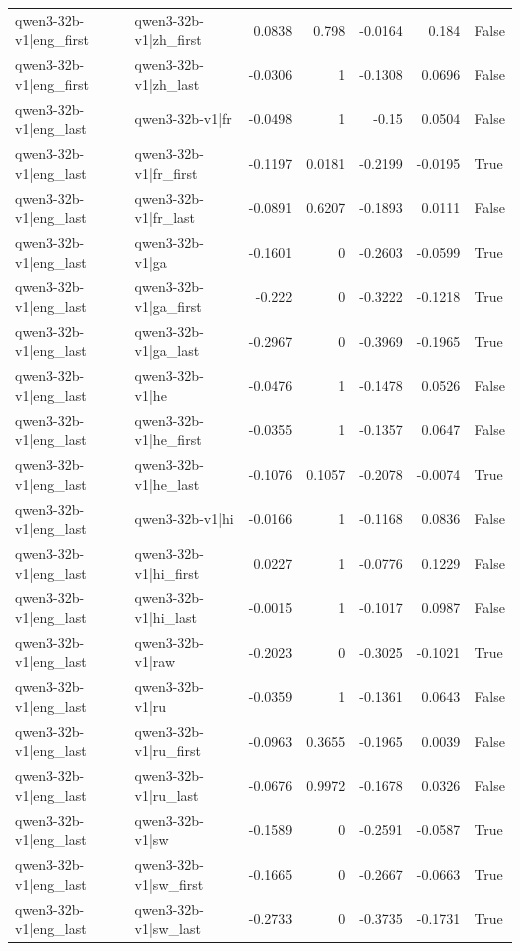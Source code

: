 \begin{table}
\begin{tabular}{l l r r r r l}
qwen3-32b-v1|eng_first & qwen3-32b-v1|zh_first & 0.0838 & 0.798 & -0.0164 & 0.184 & False \\
qwen3-32b-v1|eng_first & qwen3-32b-v1|zh_last & -0.0306 & 1 & -0.1308 & 0.0696 & False \\
qwen3-32b-v1|eng_last & qwen3-32b-v1|fr & -0.0498 & 1 & -0.15 & 0.0504 & False \\
qwen3-32b-v1|eng_last & qwen3-32b-v1|fr_first & -0.1197 & 0.0181 & -0.2199 & -0.0195 & True \\
qwen3-32b-v1|eng_last & qwen3-32b-v1|fr_last & -0.0891 & 0.6207 & -0.1893 & 0.0111 & False \\
qwen3-32b-v1|eng_last & qwen3-32b-v1|ga & -0.1601 & 0 & -0.2603 & -0.0599 & True \\
qwen3-32b-v1|eng_last & qwen3-32b-v1|ga_first & -0.222 & 0 & -0.3222 & -0.1218 & True \\
qwen3-32b-v1|eng_last & qwen3-32b-v1|ga_last & -0.2967 & 0 & -0.3969 & -0.1965 & True \\
qwen3-32b-v1|eng_last & qwen3-32b-v1|he & -0.0476 & 1 & -0.1478 & 0.0526 & False \\
qwen3-32b-v1|eng_last & qwen3-32b-v1|he_first & -0.0355 & 1 & -0.1357 & 0.0647 & False \\
qwen3-32b-v1|eng_last & qwen3-32b-v1|he_last & -0.1076 & 0.1057 & -0.2078 & -0.0074 & True \\
qwen3-32b-v1|eng_last & qwen3-32b-v1|hi & -0.0166 & 1 & -0.1168 & 0.0836 & False \\
qwen3-32b-v1|eng_last & qwen3-32b-v1|hi_first & 0.0227 & 1 & -0.0776 & 0.1229 & False \\
qwen3-32b-v1|eng_last & qwen3-32b-v1|hi_last & -0.0015 & 1 & -0.1017 & 0.0987 & False \\
qwen3-32b-v1|eng_last & qwen3-32b-v1|raw & -0.2023 & 0 & -0.3025 & -0.1021 & True \\
qwen3-32b-v1|eng_last & qwen3-32b-v1|ru & -0.0359 & 1 & -0.1361 & 0.0643 & False \\
qwen3-32b-v1|eng_last & qwen3-32b-v1|ru_first & -0.0963 & 0.3655 & -0.1965 & 0.0039 & False \\
qwen3-32b-v1|eng_last & qwen3-32b-v1|ru_last & -0.0676 & 0.9972 & -0.1678 & 0.0326 & False \\
qwen3-32b-v1|eng_last & qwen3-32b-v1|sw & -0.1589 & 0 & -0.2591 & -0.0587 & True \\
qwen3-32b-v1|eng_last & qwen3-32b-v1|sw_first & -0.1665 & 0 & -0.2667 & -0.0663 & True \\
qwen3-32b-v1|eng_last & qwen3-32b-v1|sw_last & -0.2733 & 0 & -0.3735 & -0.1731 & True \\

\end{tabular}
\end{table}
